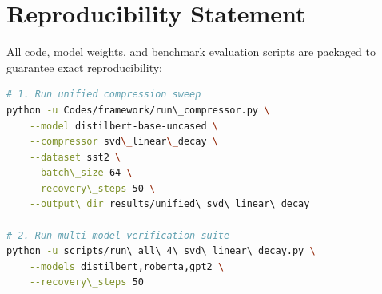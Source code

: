 \section{Reproducibility Statement}
All code, model weights, and benchmark evaluation scripts are packaged to guarantee exact reproducibility:
\begin{lstlisting}[language=bash]
# 1. Run unified compression sweep
python -u Codes/framework/run\_compressor.py \
    --model distilbert-base-uncased \
    --compressor svd\_linear\_decay \
    --dataset sst2 \
    --batch\_size 64 \
    --recovery\_steps 50 \
    --output\_dir results/unified\_svd\_linear\_decay

# 2. Run multi-model verification suite
python -u scripts/run\_all\_4\_svd\_linear\_decay.py \
    --models distilbert,roberta,gpt2 \
    --recovery\_steps 50
\end{lstlisting}
